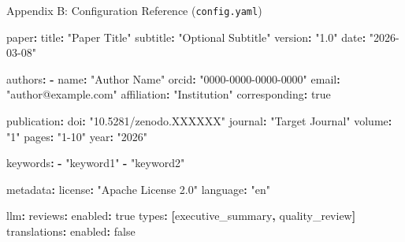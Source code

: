 \documentclass[
  ignorenonframetext,
]{beamer}
\newenvironment{Shaded}{}{}
\newcommand{\AttributeTok}[1]{\textcolor[rgb]{0.49,0.56,0.16}{#1}}
\newcommand{\CharTok}[1]{\textcolor[rgb]{0.25,0.44,0.63}{#1}}
\newcommand{\FunctionTok}[1]{\textcolor[rgb]{0.02,0.16,0.49}{#1}}
\newcommand{\KeywordTok}[1]{\textcolor[rgb]{0.00,0.44,0.13}{\textbf{#1}}}
\newcommand{\StringTok}[1]{\textcolor[rgb]{0.25,0.44,0.63}{#1}}
\begin{document}
\begin{frame}[fragile]{Appendix B: Configuration Reference
(\texttt{config.yaml})}
\protect{}\label{appendix-b-configuration-reference-config.yaml}
\begin{Shaded}
\begin{Highlighting}[]
\FunctionTok{paper}\KeywordTok{:}
\AttributeTok{  }\FunctionTok{title}\KeywordTok{:}\AttributeTok{ }\StringTok{"Paper Title"}
\AttributeTok{  }\FunctionTok{subtitle}\KeywordTok{:}\AttributeTok{ }\StringTok{"Optional Subtitle"}
\AttributeTok{  }\FunctionTok{version}\KeywordTok{:}\AttributeTok{ }\StringTok{"1.0"}
\AttributeTok{  }\FunctionTok{date}\KeywordTok{:}\AttributeTok{ }\StringTok{"2026{-}03{-}08"}

\FunctionTok{authors}\KeywordTok{:}
\AttributeTok{  }\KeywordTok{{-}}\AttributeTok{ }\FunctionTok{name}\KeywordTok{:}\AttributeTok{ }\StringTok{"Author Name"}
\AttributeTok{    }\FunctionTok{orcid}\KeywordTok{:}\AttributeTok{ }\StringTok{"0000{-}0000{-}0000{-}0000"}
\AttributeTok{    }\FunctionTok{email}\KeywordTok{:}\AttributeTok{ }\StringTok{"author@example.com"}
\AttributeTok{    }\FunctionTok{affiliation}\KeywordTok{:}\AttributeTok{ }\StringTok{"Institution"}
\AttributeTok{    }\FunctionTok{corresponding}\KeywordTok{:}\AttributeTok{ }\CharTok{true}

\FunctionTok{publication}\KeywordTok{:}
\AttributeTok{  }\FunctionTok{doi}\KeywordTok{:}\AttributeTok{ }\StringTok{"10.5281/zenodo.XXXXXX"}
\AttributeTok{  }\FunctionTok{journal}\KeywordTok{:}\AttributeTok{ }\StringTok{"Target Journal"}
\AttributeTok{  }\FunctionTok{volume}\KeywordTok{:}\AttributeTok{ }\StringTok{"1"}
\AttributeTok{  }\FunctionTok{pages}\KeywordTok{:}\AttributeTok{ }\StringTok{"1{-}10"}
\AttributeTok{  }\FunctionTok{year}\KeywordTok{:}\AttributeTok{ }\StringTok{"2026"}

\FunctionTok{keywords}\KeywordTok{:}
\AttributeTok{  }\KeywordTok{{-}}\AttributeTok{ }\StringTok{"keyword1"}
\AttributeTok{  }\KeywordTok{{-}}\AttributeTok{ }\StringTok{"keyword2"}

\FunctionTok{metadata}\KeywordTok{:}
\AttributeTok{  }\FunctionTok{license}\KeywordTok{:}\AttributeTok{ }\StringTok{"Apache License 2.0"}
\AttributeTok{  }\FunctionTok{language}\KeywordTok{:}\AttributeTok{ }\StringTok{"en"}

\FunctionTok{llm}\KeywordTok{:}
\AttributeTok{  }\FunctionTok{reviews}\KeywordTok{:}
\AttributeTok{    }\FunctionTok{enabled}\KeywordTok{:}\AttributeTok{ }\CharTok{true}
\AttributeTok{    }\FunctionTok{types}\KeywordTok{:}\AttributeTok{ }\KeywordTok{[}\AttributeTok{executive\_summary}\KeywordTok{,}\AttributeTok{ quality\_review}\KeywordTok{]}
\AttributeTok{  }\FunctionTok{translations}\KeywordTok{:}
\AttributeTok{    }\FunctionTok{enabled}\KeywordTok{:}\AttributeTok{ }\CharTok{false}


\end{Highlighting}
\end{Shaded}
\end{frame}
\end{document}
